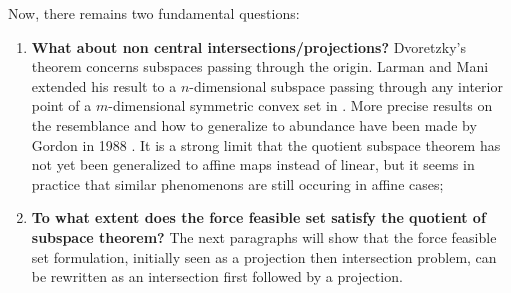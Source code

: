 Now, there remains two fundamental questions:
\begin{enumerate}
    \item {\textbf{What about non central intersections/projections?} Dvoretzky's theorem concerns subspaces passing through the origin. Larman and Mani extended his result to a $n$-dimensional subspace passing through any interior point of a $m$-dimensional symmetric convex set in \cite{larmanAlmostEllipsoidalSections1975a}. More precise results on the resemblance and how to generalize to abundance have been made by Gordon in 1988 \cite{gordonGaussianProcessesAlmost1988}. It is a strong limit that the quotient subspace theorem has not yet been generalized to affine maps instead of linear, but it seems in practice that similar phenomenons are still occuring in affine cases;}
    \item {\textbf{To what extent does the force feasible set satisfy the quotient of subspace theorem?} The next paragraphs will show that the force feasible set formulation, initially seen as a projection then intersection problem, can be rewritten as an intersection first followed by a projection.}
\end{enumerate}

